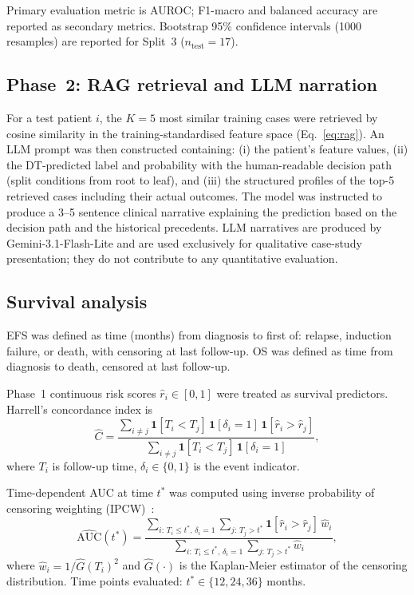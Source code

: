 \documentclass[pdflatex,sn-nature]{sn-jnl}
\begin{document}
Primary evaluation metric is AUROC; F1-macro and balanced accuracy
are reported as secondary metrics.
Bootstrap 95\% confidence intervals (1000 resamples) are reported for
Split~3 ($n_{\text{test}}=17$).

\subsection{Phase~2: RAG retrieval and LLM narration}\label{sec:rag_methods}

For a test patient $i$, the $K=5$ most similar training cases were
retrieved by cosine similarity in the training-standardised feature
space (Eq.~\ref{eq:rag}).
An LLM prompt was then constructed containing:
(i) the patient's feature values, (ii) the DT-predicted label and
probability with the human-readable decision path (split conditions
from root to leaf), and (iii) the structured profiles of the top-5
retrieved cases including their actual outcomes.
The model was instructed to produce a 3--5 sentence clinical
narrative explaining the prediction based on the decision path and the
historical precedents.
LLM narratives are produced by Gemini-3.1-Flash-Lite and are used
exclusively for qualitative case-study presentation; they do not
contribute to any quantitative evaluation.

\subsection{Survival analysis}\label{sec:surv_methods}

EFS was defined as time (months) from diagnosis to first of:
relapse, induction failure, or death, with censoring at last
follow-up.
OS was defined as time from diagnosis to death, censored at last
follow-up.

Phase~1 continuous risk scores $\hat{r}_i \in [0,1]$ were treated as
survival predictors.
Harrell's concordance index is
\begin{equation}
\hat{C} =
\frac{
  \displaystyle\sum_{i \neq j}
  \mathbf{1}[T_i < T_j]\,
  \mathbf{1}[\delta_i = 1]\,
  \mathbf{1}[\hat{r}_i > \hat{r}_j]
}{
  \displaystyle\sum_{i \neq j}
  \mathbf{1}[T_i < T_j]\,
  \mathbf{1}[\delta_i = 1]
},
\label{eq:cindex}
\end{equation}
where $T_i$ is follow-up time, $\delta_i \in \{0,1\}$ is the event
indicator.

Time-dependent AUC at time $t^*$ was computed using inverse
probability of censoring weighting (IPCW)~\cite{[CITE:Uno2011]}:
\begin{equation}
\widehat{\text{AUC}}(t^*) =
\frac{
  \displaystyle\sum_{i:\,T_i \leq t^*,\,\delta_i=1}
  \sum_{j:\,T_j > t^*}
  \mathbf{1}[\hat{r}_i > \hat{r}_j]\,\hat{w}_i
}{
  \displaystyle\sum_{i:\,T_i \leq t^*,\,\delta_i=1}
  \sum_{j:\,T_j > t^*}
  \hat{w}_i
},
\label{eq:itauc}
\end{equation}
where $\hat{w}_i = 1/\hat{G}(T_i)^2$ and $\hat{G}(\cdot)$ is the
Kaplan-Meier estimator of the censoring distribution.
Time points evaluated: $t^* \in \{12, 24, 36\}$ months.
\end{document}
